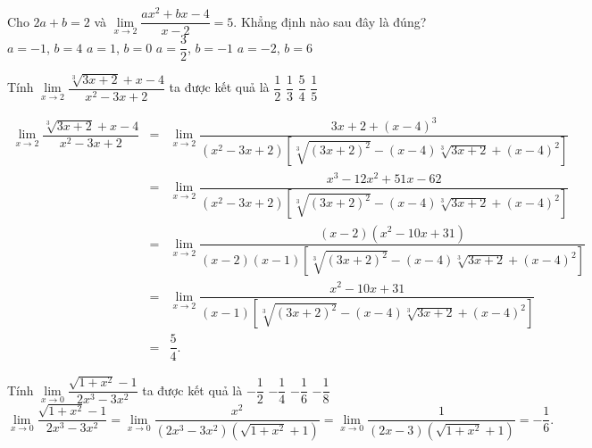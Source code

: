 \begin{ex}%
	Cho $ 2a+b=2 $ và $ \lim\limits_{x \to 2} \dfrac{ax^2+bx-4}{x-2}=5$. Khẳng định nào sau đây là đúng?
	\choice
	{$a=-1$, $b=4$}
	{$a=1$, $b=0$}
	{\True $a=\dfrac{3}{2}$, $b=-1$}
	{$a=-2$, $b=6$}
\end{ex}

\begin{ex}%
	Tính $\lim\limits_{x \to 2}\dfrac{\sqrt[3]{3x+2} + x - 4}{x^2 - 3x + 2}$ ta được kết quả là
	\choice
	{$\dfrac{1}{2}$}
	{$\dfrac{1}{3}$}
	{\True $\dfrac{5}{4}$}
	{$\dfrac{1}{5}$}
	\loigiai
	{
		\allowdisplaybreaks
		\begin{eqnarray*}
			\lim\limits_{x \to 2}\dfrac{\sqrt[3]{3x+2} + x - 4}{x^2 - 3x + 2} &=& \lim\limits_{x \to 2}\dfrac{3x + 2 + (x-4)^3}{(x^2 - 3x + 2)\left[\sqrt[3]{(3x+2)^2} - (x-4)\sqrt[3]{3x+2} + (x-4)^2\right]}\\
			&=& \lim\limits_{x \to 2}\dfrac{x^3 - 12x^2 + 51x - 62}{(x^2 - 3x + 2)\left[\sqrt[3]{(3x+2)^2} - (x-4)\sqrt[3]{3x+2} + (x-4)^2\right]}\\
			&=& \lim\limits_{x \to 2}\dfrac{(x-2)(x^2 - 10x + 31)}{(x-2)(x-1)\left[\sqrt[3]{(3x+2)^2} - (x-4)\sqrt[3]{3x+2} + (x-4)^2\right]}\\
			&=& \lim\limits_{x \to 2}\dfrac{x^2 - 10x + 31}{(x-1)\left[\sqrt[3]{(3x+2)^2} - (x-4)\sqrt[3]{3x+2} + (x-4)^2\right]}\\
			&=& \dfrac{5}{4}.
		\end{eqnarray*}
		
	}
\end{ex}	

\begin{ex}%
	Tính $\lim\limits_{x \to 0}\dfrac{\sqrt{1+x^2} - 1}{2x^3 - 3x^2}$ ta được kết quả là
	\choice
	{$-\dfrac{1}{2}$}
	{$-\dfrac{1}{4}$}
	{\True $-\dfrac{1}{6}$}
	{$-\dfrac{1}{8}$}
	\loigiai
	{
		$$\lim\limits_{x \to 0}\dfrac{\sqrt{1+x^2} - 1}{2x^3 - 3x^2} = \lim\limits_{x \to 0}\dfrac{x^2}{(2x^3 - 3x^2) \left(\sqrt{1+x^2} + 1\right)} = \lim\limits_{x \to 0}\dfrac{1}{(2x - 3) \left(\sqrt{1+x^2} + 1\right)} = -\dfrac{1}{6}.$$
	}
\end{ex}

